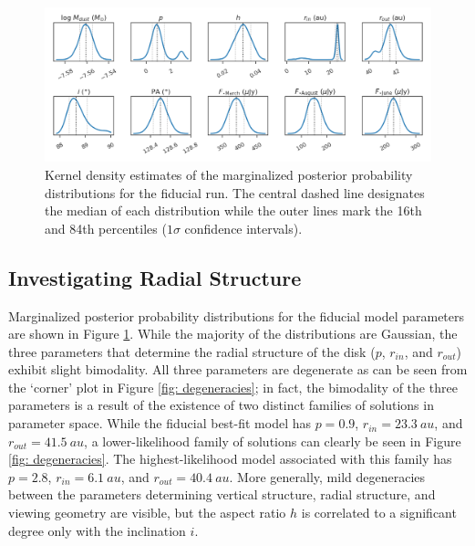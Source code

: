 \documentclass[modern]{aastex62}
\begin{document}
\begin{figure}
  \centering
  \includegraphics[width=\linewidth]{../figures/fiducial_kde}
  \caption{Kernel density estimates of the marginalized posterior probability distributions for the fiducial run. The central dashed line designates the median of each distribution while the outer lines mark the 16th and 84th percentiles ($1\sigma$ confidence intervals).}
  \label{fig: kde}
\end{figure}

\subsection{Investigating Radial Structure}
\label{subsection: radial analysis}

Marginalized posterior probability distributions for the fiducial model parameters are shown in Figure \ref{fig: kde}.
While the majority of the distributions are Gaussian, the three parameters that determine the radial structure of the disk ($p$, $r_{in}$, and $r_{out}$) exhibit slight bimodality. 
All three parameters are degenerate as can be seen from the `corner' plot in Figure \ref{fig: degeneracies}; in fact, the bimodality of the three parameters is a result of the existence of two distinct families of solutions in parameter space.
While the fiducial best-fit model has $p=0.9$, $r_{in}=\SI{23.3}{au}$, and $r_{out}=\SI{41.5}{au}$, a lower-likelihood family of solutions can clearly be seen in Figure \ref{fig: degeneracies}. The highest-likelihood model associated with this family has $p = 2.8$, $r_{in} = \SI{6.1}{au}$, and $r_{out} = \SI{40.4}{au}$.
More generally, mild degeneracies between the parameters determining vertical structure, radial  structure, and viewing geometry are visible, but the aspect ratio $h$ is correlated to a significant degree only with the inclination $i$.
\end{document}
